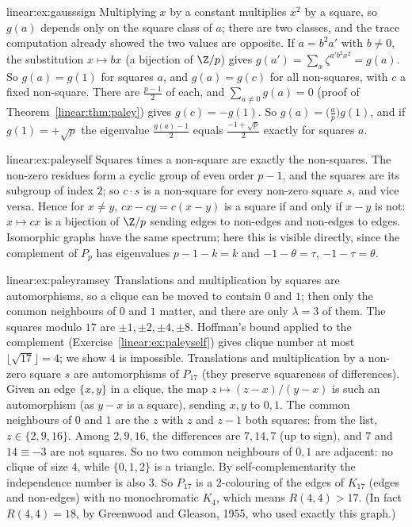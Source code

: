 \begin{solution}{linear:ex:gausssign}
\idea Multiplying $x$ by a constant multiplies $x^2$ by a square, so $g(a)$ depends only on the square class of $a$; there are two
classes, and the trace computation already showed the two values are opposite.
\writeup If $a=b^2a'$ with $b\ne0$, the substitution $x\mapsto bx$ (a bijection of $\Z/p$) gives $g(a')=\sum_x\zeta^{a'b^2x^2}=g(a)$. So
$g(a)=g(1)$ for squares $a$, and $g(a)=g(c)$ for all non-squares, with $c$ a fixed non-square. There are $\frac{p-1}2$ of each, and
$\sum_{a\ne0}g(a)=0$ (proof of Theorem~\ref{linear:thm:paley}) gives $g(c)=-g(1)$. So $g(a)=\bigl(\frac ap\bigr)g(1)$, and if $g(1)=+\sqrt p$
the eigenvalue $\frac{g(a)-1}2$ equals $\frac{-1+\sqrt p}2$ exactly for squares $a$.
\end{solution}

\begin{solution}{linear:ex:paleyself}
\idea Squares times a non-square are exactly the non-squares.
\writeup The non-zero residues form a cyclic group of even order $p-1$, and the squares are its subgroup of index $2$; so $c\cdot s$ is
a non-square for every non-zero square $s$, and vice versa. Hence for $x\ne y$, $cx-cy=c(x-y)$ is a square if and only if $x-y$
is not: $x\mapsto cx$ is a bijection of $\Z/p$ sending edges to non-edges and non-edges to edges. Isomorphic graphs have the same
spectrum; here this is visible directly, since the complement of $P_p$ has eigenvalues $p-1-k=k$ and $-1-\theta=\tau$, $-1-\tau=\theta$.
\end{solution}

\begin{solution}{linear:ex:paleyramsey}
\idea Translations and multiplication by squares are automorphisms, so a clique can be moved to contain $0$ and $1$; then only the
common neighbours of $0$ and $1$ matter, and there are only $\lambda=3$ of them.
\writeup The squares modulo $17$ are $\pm1,\pm2,\pm4,\pm8$. Hoffman's bound applied to the complement (Exercise~\ref{linear:ex:paleyself})
gives clique number at most $\lfloor\sqrt{17}\rfloor=4$; we show $4$ is impossible. Translations and multiplication by a non-zero
square $s$ are automorphisms of $P_{17}$ (they preserve squareness of differences). Given an edge $\{x,y\}$ in a clique, the map
$z\mapsto(z-x)/(y-x)$ is such an automorphism (as $y-x$ is a square), sending $x,y$ to $0,1$. The common neighbours of $0$ and $1$ are
the $z$ with $z$ and $z-1$ both squares: from the list, $z\in\{2,9,16\}$. Among $2,9,16$, the differences are $7,14,7$ (up to sign),
and $7$ and $14\equiv-3$ are not squares. So no two common neighbours of $0,1$ are adjacent: no clique of size $4$, while $\{0,1,2\}$ is a
triangle. By self-complementarity the independence number is also $3$. So $P_{17}$ is a $2$-colouring of the edges of $K_{17}$ (edges
and non-edges) with no monochromatic $K_4$, which means $R(4,4)>17$. (In fact $R(4,4)=18$, by Greenwood and Gleason, 1955, who used
exactly this graph.)
\end{solution}

